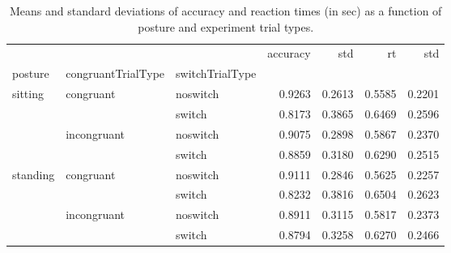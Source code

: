 \begin{table}
\centering
\caption{Means and standard deviations of accuracy and reaction times (in sec) as a function of posture and experiment trial types.}
\label{table-task-switching-replication-reaction-time}
\begin{tabular}{lllrrrr}
\toprule
         &             &        & accuracy &    std &     rt &    std \\
posture & congruantTrialType & switchTrialType &          &        &        &        \\
\midrule
sitting & congruant & noswitch &   0.9263 & 0.2613 & 0.5585 & 0.2201 \\
         &             & switch &   0.8173 & 0.3865 & 0.6469 & 0.2596 \\
         & incongruant & noswitch &   0.9075 & 0.2898 & 0.5867 & 0.2370 \\
         &             & switch &   0.8859 & 0.3180 & 0.6290 & 0.2515 \\
standing & congruant & noswitch &   0.9111 & 0.2846 & 0.5625 & 0.2257 \\
         &             & switch &   0.8232 & 0.3816 & 0.6504 & 0.2623 \\
         & incongruant & noswitch &   0.8911 & 0.3115 & 0.5817 & 0.2373 \\
         &             & switch &   0.8794 & 0.3258 & 0.6270 & 0.2466 \\
\bottomrule
\end{tabular}
\end{table}
